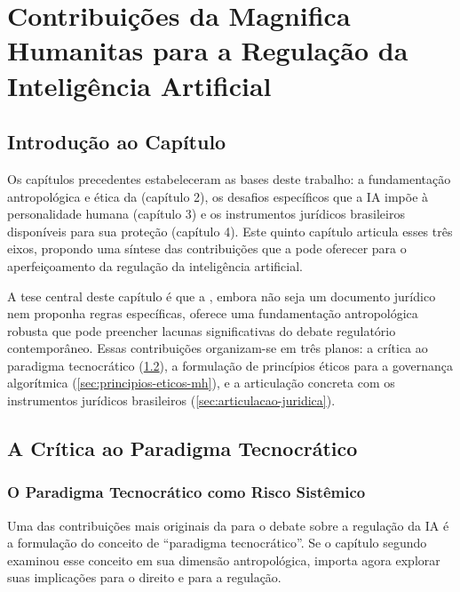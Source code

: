 
\chapter{Contribuições da Magnifica Humanitas para a Regulação da Inteligência Artificial}
\label{cap:contribuicoes}

\section{Introdução ao Capítulo}
\label{sec:intro-cap5}

Os capítulos precedentes estabeleceram as bases deste trabalho: a fundamentação antropológica e ética da \MH{} (capítulo 2), os desafios específicos que a IA impõe à personalidade humana (capítulo 3) e os instrumentos jurídicos brasileiros disponíveis para sua proteção (capítulo 4). Este quinto capítulo articula esses três eixos, propondo uma síntese das contribuições que a \MH{} pode oferecer para o aperfeiçoamento da regulação da inteligência artificial.

A tese central deste capítulo é que a \MH{}, embora não seja um documento jurídico nem proponha regras específicas, oferece uma fundamentação antropológica robusta que pode preencher lacunas significativas do debate regulatório contemporâneo. Essas contribuições organizam-se em três planos: a crítica ao paradigma tecnocrático (\ref{sec:critica-tecnocratico}), a formulação de princípios éticos para a governança algorítmica (\ref{sec:principios-eticos-mh}), e a articulação concreta com os instrumentos jurídicos brasileiros (\ref{sec:articulacao-juridica}).

\section{A Crítica ao Paradigma Tecnocrático}
\label{sec:critica-tecnocratico}

\subsection{O Paradigma Tecnocrático como Risco Sistêmico}
\label{subsec:paradigma-risco-sistemico}

Uma das contribuições mais originais da \MH{} para o debate sobre a regulação da IA é a formulação do conceito de ``paradigma tecnocrático''. Se o capítulo segundo examinou esse conceito em sua dimensão antropológica, importa agora explorar suas implicações para o direito e para a regulação.

